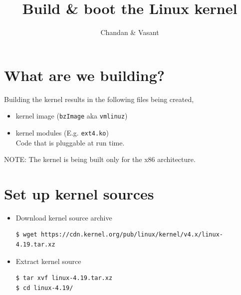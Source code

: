 \documentclass{beamer}
\title{Build \& boot the Linux kernel}
\author{Chandan \& Vasant}
\date{}
\begin{document}
\begin{frame}
  \titlepage
\end{frame}

\section{What are we building?}
\begin{frame}
\end{frame}

\begin{frame}
Building the kernel results in the following files being created,
\begin{itemize}
\item kernel image (\texttt{bzImage} aka \texttt{vmlinuz})
\item kernel modules (E.g. \texttt{ext4.ko}) \\
  Code that is pluggable at run time.
\end{itemize}
NOTE: The kernel is being built only for the x86 architecture.
\end{frame}

\section{Set up kernel sources}
\label{sec:set-up-kernel-1}

\begin{frame}[fragile]
  \begin{itemize}
  \item Download kernel source archive
    \begin{lstlisting}
$ wget https://cdn.kernel.org/pub/linux/kernel/v4.x/linux-4.19.tar.xz
    \end{lstlisting}

  \item Extract kernel source
    \begin{lstlisting}
$ tar xvf linux-4.19.tar.xz 
$ cd linux-4.19/
    \end{lstlisting}
  \end{itemize}
\end{frame}
\end{document}
